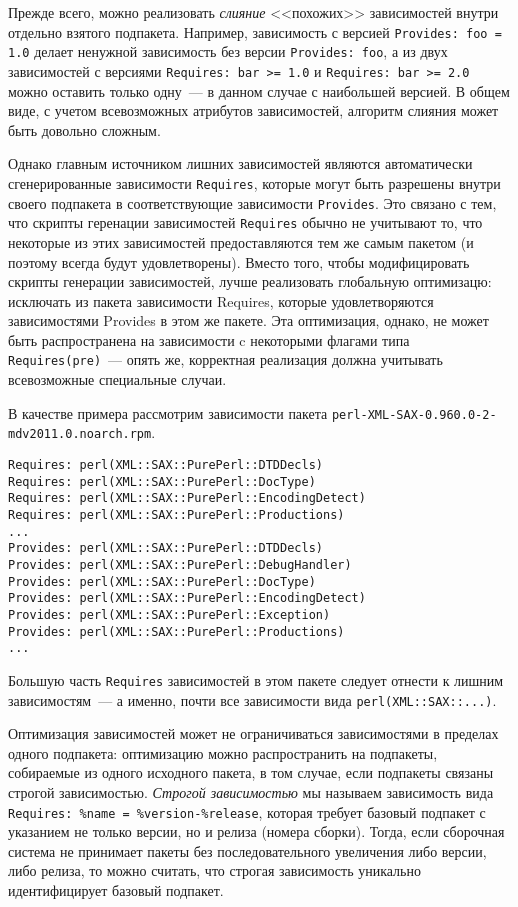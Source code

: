 \documentclass[russian,a4paper,12pt,titlepage]{article}
\begin{document}
Прежде всего, можно реализовать \textit{слияние} <<похожих>> зависимостей внутри отдельно взятого подпакета.
Например, зависимость с версией \verb|Provides: foo = 1.0| делает ненужной зависимость без версии \verb|Provides: foo|,
а из двух зависимостей с версиями \verb|Requires: bar >= 1.0| и \verb|Requires: bar >= 2.0| можно оставить только
одну~--- в данном случае с наибольшей версией.  В общем виде, с учетом всевозможных атрибутов зависимостей,
алгоритм слияния может быть довольно сложным.

Однако главным источником лишних зависимостей являются автоматически сгенерированные зависимости \verb|Requires|,
которые могут быть разрешены внутри своего подпакета в соответствующие зависимости \verb|Provides|.  Это
связано с тем, что скрипты геренации зависимостей \verb|Requires| обычно не учитывают то, что некоторые
из этих зависимостей предоставляются тем же самым пакетом (и поэтому всегда будут удовлетворены).
Вместо того, чтобы модифицировать скрипты генерации зависимостей, лучше реализовать глобальную оптимизацю:
исключать из пакета зависимости Requires, которые удовлетворяются зависимостями Provides в этом же пакете.
Эта оптимизация, однако, не может быть распространена на зависимости c некоторыми флагами типа \verb|Requires(pre)|~---
опять же, корректная реализация должна учитывать всевозможные специальные случаи.

В качестве примера рассмотрим зависимости пакета \verb|perl-XML-SAX-0.960.0-2-mdv2011.0.noarch.rpm|.
\begin{verbatim}
Requires: perl(XML::SAX::PurePerl::DTDDecls)
Requires: perl(XML::SAX::PurePerl::DocType)
Requires: perl(XML::SAX::PurePerl::EncodingDetect)
Requires: perl(XML::SAX::PurePerl::Productions)
...
Provides: perl(XML::SAX::PurePerl::DTDDecls)
Provides: perl(XML::SAX::PurePerl::DebugHandler)
Provides: perl(XML::SAX::PurePerl::DocType)
Provides: perl(XML::SAX::PurePerl::EncodingDetect)
Provides: perl(XML::SAX::PurePerl::Exception)
Provides: perl(XML::SAX::PurePerl::Productions)
...
\end{verbatim}
Большую часть \verb|Requires| зависимостей в этом пакете следует отнести к лишним зависимостям~---
а именно, почти все зависимости вида \verb|perl(XML::SAX::...)|.

Оптимизация зависимостей может не ограничиваться зависимостями в пределах одного подпакета:
оптимизацию можно распространить на подпакеты, собираемые из одного исходного пакета, в том случае,
если подпакеты связаны строгой зависимостью.  \textit{Строгой зависимостью} мы называем зависимость
вида \verb|Requires: %name = %version-%release|, которая требует базовый подпакет с указанием не
только версии, но и релиза (номера сборки).  Тогда, если сборочная система не принимает пакеты
без последовательного увеличения либо версии, либо релиза, то можно считать, что строгая зависимость
уникально идентифицирует базовый подпакет.
\end{document}
